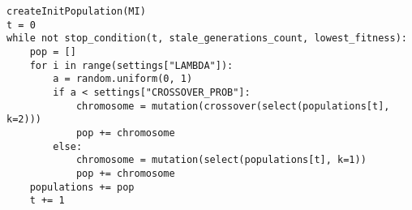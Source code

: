 \lstset{language=Python}
\begin{lstlisting}
createInitPopulation(MI)
t = 0
while not stop_condition(t, stale_generations_count, lowest_fitness):
    pop = []
    for i in range(settings["LAMBDA"]):
        a = random.uniform(0, 1)
        if a < settings["CROSSOVER_PROB"]:
            chromosome = mutation(crossover(select(populations[t], k=2)))
            pop += chromosome
        else:
            chromosome = mutation(select(populations[t], k=1))
            pop += chromosome
    populations += pop
    t += 1
\end{lstlisting}